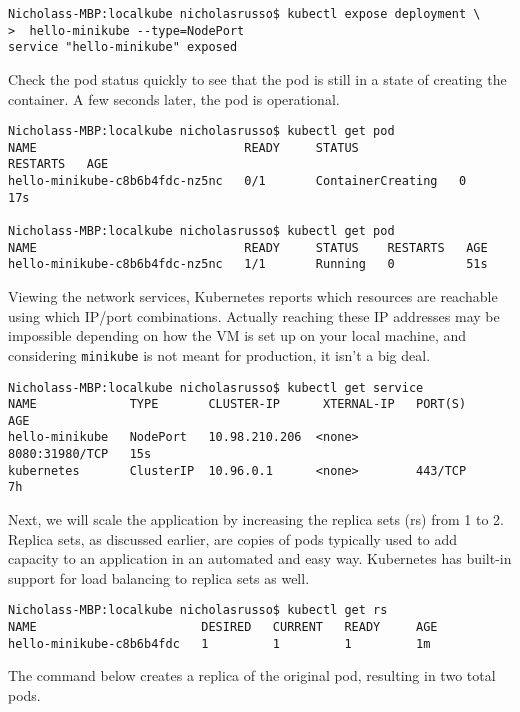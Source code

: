 \begin{verbatim}
Nicholass-MBP:localkube nicholasrusso$ kubectl expose deployment \
>  hello-minikube --type=NodePort
service "hello-minikube" exposed
\end{verbatim}

Check the pod status quickly to see that the pod is still in a state of creating the
container. A few seconds later, the pod is operational.

\begin{verbatim}
Nicholass-MBP:localkube nicholasrusso$ kubectl get pod
NAME                             READY     STATUS              RESTARTS   AGE
hello-minikube-c8b6b4fdc-nz5nc   0/1       ContainerCreating   0          17s

Nicholass-MBP:localkube nicholasrusso$ kubectl get pod
NAME                             READY     STATUS    RESTARTS   AGE
hello-minikube-c8b6b4fdc-nz5nc   1/1       Running   0          51s
\end{verbatim}

Viewing the network services, Kubernetes reports which resources are reachable
using which IP/port combinations. Actually reaching these IP addresses may be
impossible depending on how the VM is set up on your local machine, and
considering \verb|minikube| is not meant for production, it isn't a big deal.

\begin{verbatim}
Nicholass-MBP:localkube nicholasrusso$ kubectl get service
NAME             TYPE       CLUSTER-IP      XTERNAL-IP   PORT(S)          AGE
hello-minikube   NodePort   10.98.210.206  <none>        8080:31980/TCP   15s
kubernetes       ClusterIP  10.96.0.1      <none>        443/TCP          7h
\end{verbatim}

Next, we will scale the application by increasing the replica sets (rs) from 1
to 2. Replica sets, as discussed earlier, are copies of pods typically used to
add capacity to an application in an automated and easy way. Kubernetes has
built-in support for load balancing to replica sets as well.

\begin{verbatim}
Nicholass-MBP:localkube nicholasrusso$ kubectl get rs
NAME                       DESIRED   CURRENT   READY     AGE
hello-minikube-c8b6b4fdc   1         1         1         1m
\end{verbatim}

The command below creates a replica of the original pod, resulting in two total pods.

